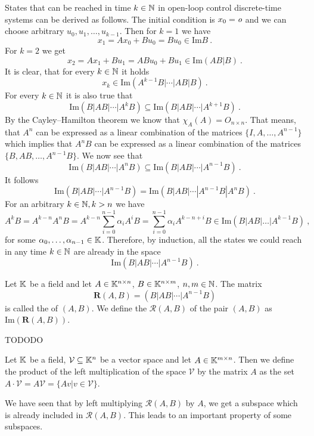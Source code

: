 \sloppy
States that can be reached in time $k\in\mathbb{N}$ in open-loop control discrete-time systems can be derived as follows. The initial condition is $x_0=\textit{o}$ and we can choose arbitrary $u_0,u_1,\ldots,u_{k-1}$. Then for $k=1$ we have 
$$x_1=Ax_0+Bu_0=Bu_0 \in \text{Im}B\ .$$
For $k=2$ we get
$$x_2=Ax_1+Bu_1=ABu_0+Bu_1\in\text{Im}(AB|B)\ .$$
It is clear, that for every $k\in\mathbb{N}$ it holds
$$x_k\in\text{Im}(A^{k-1}B|\cdots|AB|B)\ .$$
For every $k\in\mathbb{N}$ it is also true that
$$\text{Im}(B|AB|\cdots|A^kB) \subseteq \text{Im}(B|AB|\cdots|A^{k+1}B)\ .$$
By the Cayley–Hamilton theorem we know that $\chi_A(A)=O_{n\times n}$. That means, that $A^n$ can be expressed as a linear combination of the matrices $\{I,A,\ldots,A^{n-1}\}$ which implies that $A^nB$ can be expressed as a linear combination of the matrices $\{B,AB,\ldots,A^{n-1}B\}$. We now see that $$\text{Im}(B|AB|\cdots|A^{n}B) \subseteq \text{Im}(B|AB|\cdots|A^{n-1}B)\ .$$
It follows
\begin{equation}
\label{eq:cayleHamilReachable}
	\text{Im}(B|AB|\cdots|A^{n-1}B)=\text{Im}(B|AB|\cdots|A^{n-1}B|A^nB)\ .
\end{equation}
For an arbitrary $k\in\mathbb{N},k>n$ we have $$A^kB=A^{k-n}A^nB=A^{k-n}\sum^{n-1}_{i=0}\alpha_i A^iB=\sum^{n-1}_{i=0}\alpha_i A^{k-n+i}B\in\text{Im}(B|AB|\ldots|A^{k-1}B)\ ,$$
for some $\alpha_0,\ldots,\alpha_{n-1}\in\mathbb{K}$.
Therefore, by induction, all the states we could reach in any time $k\in\mathbb{N}$ are already in the space 
$$\text{Im}(B|AB|\cdots|A^{n-1}B)\ .$$
\begin{definition}
	Let $\mathbb{K}$ be a field and let $A \in \mathbb{K}^{n \times n}$, $B \in \mathbb{K}^{n \times m}$, $n,m \in \mathbb{N}$. The matrix $$\mathbf{R}(A,B)=(B|AB|\cdots|A^{n-1}B)$$ is called the  of $(A,B)$. We define the  $\mathcal{R}(A,B)$ of the pair $(A,B)$ as $\text{Im}(\mathbf{R}(A,B))$. 
\end{definition}
TODODO
\begin{definition}
	Let $\mathbb{K}$ be a field, $\mathcal{V} \subseteq \mathbb{K}^n$ be a vector space and let $A\in\mathbb{K}^{m\times n}$. Then we define the product of the left multiplication of the space $\mathcal{V}$ by the matrix $A$ as the set $A\cdot\mathcal{V}=A\mathcal{V}=\{Av|v\in\mathcal{V}\}$.
\end{definition}

We have seen that by left multiplying $\mathcal{R}(A,B)$ by $A$, we get a subspace which is already included in $\mathcal{R}(A,B)$. This leads to an important property of some subspaces.

